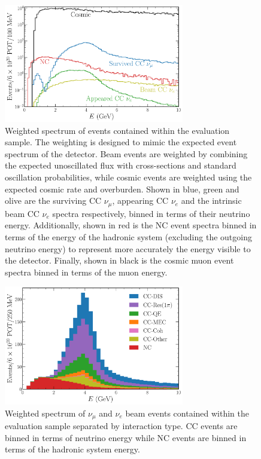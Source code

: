 \begin{figure} %
    \includegraphics[width=0.7\textwidth]{diagrams/6-cvn/chipsnet/explore_osc_fluxes.pdf}
    \caption[Weighted spectrum of evaluation sample events.]
    {Weighted spectrum of events contained within the evaluation sample. The weighting is designed
        to mimic the expected event spectrum of the \chipsfive detector. Beam events are weighted
        by combining the expected unoscillated flux with cross-sections and standard oscillation
        probabilities, while cosmic events are weighted using the expected cosmic rate and
        overburden. Shown in blue, green and olive are the surviving CC $\nu_{\mu}$, appearing CC
        $\nu_{e}$ and the intrinsic beam CC $\nu_{e}$ spectra respectively, binned in terms of
        their neutrino energy. Additionally, shown in red is the NC event spectra binned in terms
        of the energy of the hadronic system (excluding the outgoing neutrino energy) to represent
        more accurately the energy visible to the detector. Finally, shown in black is the cosmic
        muon event spectra binned in terms of the muon energy.}
    \label{fig:explore_osc_fluxes}
\end{figure}

\begin{figure} %
    \includegraphics[width=0.7\textwidth]{diagrams/6-cvn/chipsnet/explore_stacked_int_types.pdf}
    \caption[Weighted spectrum of interaction types within the evaluation sample.]
    {Weighted spectrum of $\nu_{\mu}$ and $\nu_{e}$ beam events contained within the evaluation
        sample separated by interaction type. CC events are binned in terms of neutrino energy
        while NC events are binned in terms of the hadronic system energy.}
    \label{fig:explore_stacked_int_types}
\end{figure}

